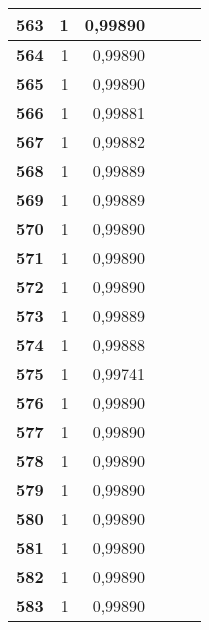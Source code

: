 \begin{longtable}{|r|r|r|l|r|r|}
\textbf{563} & 1 & 0,99890 &  & \multicolumn{1}{l|}{} & \multicolumn{1}{l|}{} \\ \hline
\textbf{564} & 1 & 0,99890 &  & \multicolumn{1}{l|}{} & \multicolumn{1}{l|}{} \\ \hline
\textbf{565} & 1 & 0,99890 &  & \multicolumn{1}{l|}{} & \multicolumn{1}{l|}{} \\ \hline
\textbf{566} & 1 & 0,99881 &  & \multicolumn{1}{l|}{} & \multicolumn{1}{l|}{} \\ \hline
\textbf{567} & 1 & 0,99882 &  & \multicolumn{1}{l|}{} & \multicolumn{1}{l|}{} \\ \hline
\textbf{568} & 1 & 0,99889 &  & \multicolumn{1}{l|}{} & \multicolumn{1}{l|}{} \\ \hline
\textbf{569} & 1 & 0,99889 &  & \multicolumn{1}{l|}{} & \multicolumn{1}{l|}{} \\ \hline
\textbf{570} & 1 & 0,99890 &  & \multicolumn{1}{l|}{} & \multicolumn{1}{l|}{} \\ \hline
\textbf{571} & 1 & 0,99890 &  & \multicolumn{1}{l|}{} & \multicolumn{1}{l|}{} \\ \hline
\textbf{572} & 1 & 0,99890 &  & \multicolumn{1}{l|}{} & \multicolumn{1}{l|}{} \\ \hline
\textbf{573} & 1 & 0,99889 &  & \multicolumn{1}{l|}{} & \multicolumn{1}{l|}{} \\ \hline
\textbf{574} & 1 & 0,99888 &  & \multicolumn{1}{l|}{} & \multicolumn{1}{l|}{} \\ \hline
\textbf{575} & 1 & 0,99741 &  & \multicolumn{1}{l|}{} & \multicolumn{1}{l|}{} \\ \hline
\textbf{576} & 1 & 0,99890 &  & \multicolumn{1}{l|}{} & \multicolumn{1}{l|}{} \\ \hline
\textbf{577} & 1 & 0,99890 &  & \multicolumn{1}{l|}{} & \multicolumn{1}{l|}{} \\ \hline
\textbf{578} & 1 & 0,99890 &  & \multicolumn{1}{l|}{} & \multicolumn{1}{l|}{} \\ \hline
\textbf{579} & 1 & 0,99890 &  & \multicolumn{1}{l|}{} & \multicolumn{1}{l|}{} \\ \hline
\textbf{580} & 1 & 0,99890 &  & \multicolumn{1}{l|}{} & \multicolumn{1}{l|}{} \\ \hline
\textbf{581} & 1 & 0,99890 &  & \multicolumn{1}{l|}{} & \multicolumn{1}{l|}{} \\ \hline
\textbf{582} & 1 & 0,99890 &  & \multicolumn{1}{l|}{} & \multicolumn{1}{l|}{} \\ \hline
\textbf{583} & 1 & 0,99890 &  & \multicolumn{1}{l|}{} & \multicolumn{1}{l|}{} \\ \hline

\end{longtable}
